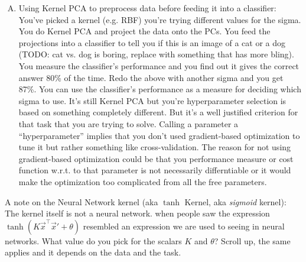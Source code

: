 {\begin{enumerate}[(A)]
\begin{enumerate}
\item Measure and compare reconstruction error between the two sigmas. It's exactly what we're looking for when doing dimensionality reduction. More intuitive than looking at a scree plot but it involves reconstructing and that involves approximations (c.f. lecture slide 1.4 \#23) so there's a drawback.
Something to keep in mind when using reconstruction error is that for the same sigma you get some value for your reconstruction error when you measure it for data that you used in training (i.e. solving the eigenvalue problem) vs. the error value you get when reconstructing test data. This is where cross validation comes in. We're going to talk about cross-validation later in the course when we talk about density estimation. Basically, you want to know how well your model does when you feed it data that it's never seen before. If it does well on training data but badly on unseen data, then you can't really deploy this model. So before deploying it you need to measure this performance (e.g. reconstruction error) on unseen data. This is called cross validation and you can use this to compare how well one sigma does vs another. How well does one sigma do on unseen data vs. the other sigma? The sigma that has better cross validation performance is the one you go with.
\end{enumerate}

\item Using Kernel PCA to preprocess data before feeding it into a classifier:
You've picked a kernel (e.g. RBF) you're trying different values for the sigma. You do Kernel PCA and project the data onto the PCs. You feed the projections into a classifier to tell you if this is an image of a cat or a dog (TODO: cat vs. dog is boring, replace with something that has more bling). You measure the classifier's performance and you find out it gives the correct answer 80\% of the time. Redo the above with another sigma and you get 87\%. You can use the classifier's performance as a measure for deciding which sigma to use. It's still Kernel PCA but you're hyperparameter selection is based on something completely different. But it's a well justified criterion for that task that you are trying to solve. Calling a parameter a ``hyperparameter'' implies that you don't used gradient-based optimization to tune it but rather something like cross-validation. The reason for not using gradient-based optimization could be that you performance measure or cost function w.r.t. to that parameter is not necessarily differntiable or it would make the optimization too complicated from all the free parameters.

\end{enumerate}

A note on the Neural Network kernel (aka $\tanh$ Kernel, aka \textit{sigmoid} kernel):
The kernel itself is not a neural network. when people saw the expression $\tanh(K \vec x^\top \vec x' + \theta)$ resembled an expression we are used to seeing in neural networks. What value do you pick for the scalars $K$ and $\theta$? Scroll up, the same applies and it depends on the data and the task.

}

